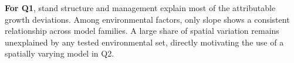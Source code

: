 \documentclass[logo,msc,ai]{infthesis}           %
\newcommand{\fig}[1]{\textcolor{purple}{[FIG: #1]}}
\begin{document}



\textbf{For Q1}, stand structure and management explain most of the attributable growth deviations. Among environmental factors, only slope shows a consistent relationship across model families. A large share of spatial variation remains unexplained by any tested environmental set, directly motivating the use of a spatially varying model in Q2.

\end{document}
